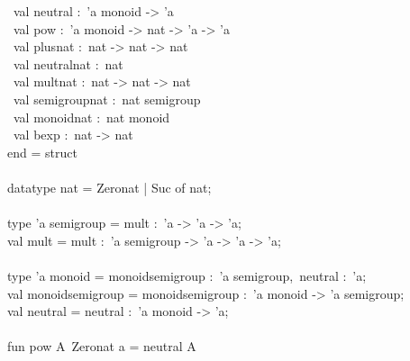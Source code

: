 \begin{isabellebody}
\begin{isamarkuptext}
\hspace*{0pt} ~val neutral :~'a monoid -> 'a\\
\hspace*{0pt} ~val pow :~'a monoid -> nat -> 'a -> 'a\\
\hspace*{0pt} ~val plus{}nat :~nat -> nat -> nat\\
\hspace*{0pt} ~val neutral{}nat :~nat\\
\hspace*{0pt} ~val mult{}nat :~nat -> nat -> nat\\
\hspace*{0pt} ~val semigroup{}nat :~nat semigroup\\
\hspace*{0pt} ~val monoid{}nat :~nat monoid\\
\hspace*{0pt} ~val bexp :~nat -> nat\\
\hspace*{0pt}end = struct\\
\hspace*{0pt}\\
\hspace*{0pt}datatype nat = Zero{}nat | Suc of nat;\\
\hspace*{0pt}\\
\hspace*{0pt}type 'a semigroup = {}mult :~'a -> 'a -> 'a{};\\
\hspace*{0pt}val mult = {}mult :~'a semigroup -> 'a -> 'a -> 'a;\\
\hspace*{0pt}\\
\hspace*{0pt}type 'a monoid = {}monoid{}semigroup :~'a semigroup,~neutral :~'a{};\\
\hspace*{0pt}val monoid{}semigroup = {}monoid{}semigroup :~'a monoid -> 'a semigroup;\\
\hspace*{0pt}val neutral = {}neutral :~'a monoid -> 'a;\\
\hspace*{0pt}\\
\hspace*{0pt}fun pow A{}~Zero{}nat a = neutral A{}\\

\end{isamarkuptext}
\end{isabellebody}
